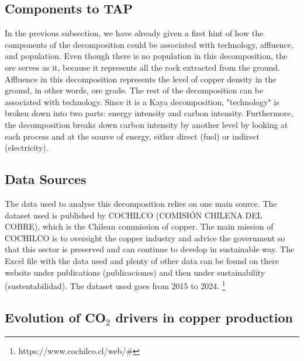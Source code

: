 \subsection{Components to TAP}
In the previous subsection, we have already given a first hint of how the components of the decomposition could be associated with technology, affluence, and population. Even though there is no population in this decomposition, the ore serves as it, because it represents all the rock extracted from the ground. Affluence in this decomposition represents the level of copper density in the ground, in other words, ore grade. The rest of the decomposition can be associated with technology. Since it is a Kaya decomposition, "technology" is broken down into two parts: energy intensity and carbon intensity. Furthermore, the decomposition breaks down carbon intensity by another level by looking at each process and at the source of energy, either direct (fuel) or indirect (electricity).
\subsection{Data Sources}
The data used to analyse this decomposition relies on one main source. The dataset used is published by COCHILCO (COMISIÓN CHILENA DEL COBRE), which is the Chilean commission of copper. The main mission of COCHILCO is to oversight the copper industry and advice the government so that this sector is preserved and can continue to develop in sustainable way.\cite{CochilcoWebsite2025} The Excel file with the data used and plenty of other data can be found on there website under publications (publicaciones) and then under sustainability (sustentabilidad). The dataset used goes from 2015 to 2024. \footnote{https://www.cochilco.cl/web/\#}
\subsection{Evolution of CO$_2$ drivers in copper production}

